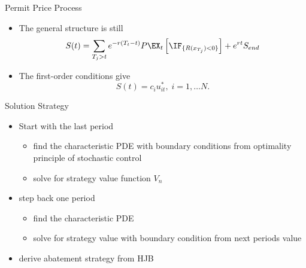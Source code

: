 {Permit Price Process}
\begin{itemize}
\item<1-> The general structure is still
$$
S(t) = \sum_{T_j >t} e^{-r(T_t-t)} P \EX_t\left[\IF_{\{R(x_{T_j})<0\}}\right] + e^{rt} S_{end}
$$
\item<2-> The first-order conditions give
$$
S(t) = c_i u_{it}^*, \; i=1, \ldots N.
$$
\end{itemize}

{Solution Strategy}
\begin{itemize}
\item<1-> Start with the last period
\begin{itemize}
\item find the characteristic PDE with boundary conditions from optimality principle of stochastic control
\item solve for strategy value function $V_n$
\end{itemize}
\item<2-> step back one period
\begin{itemize}
\item find the characteristic PDE
\item solve for strategy value with boundary condition from next periods value
\end{itemize}
\item<3-> derive abatement strategy from HJB
\end{itemize}


